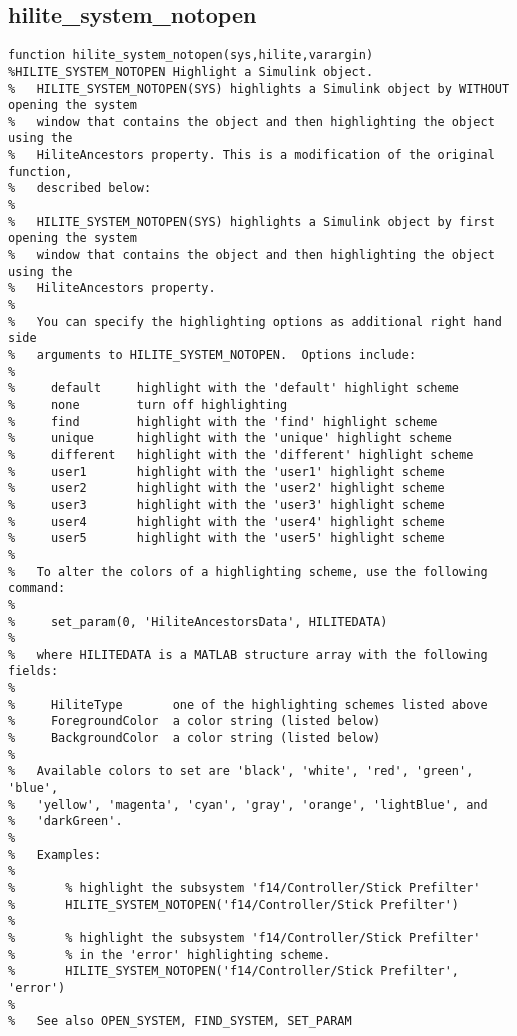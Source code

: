 \documentclass[12pt,letterpaper]{report}
\begin{document}
	\subsection{hilite\_system\_notopen}
\begin{lstlisting}
function hilite_system_notopen(sys,hilite,varargin)
%HILITE_SYSTEM_NOTOPEN Highlight a Simulink object.
%   HILITE_SYSTEM_NOTOPEN(SYS) highlights a Simulink object by WITHOUT opening the system
%   window that contains the object and then highlighting the object using the
%   HiliteAncestors property. This is a modification of the original function,
%   described below:
%
%   HILITE_SYSTEM_NOTOPEN(SYS) highlights a Simulink object by first opening the system
%   window that contains the object and then highlighting the object using the
%   HiliteAncestors property.
%
%   You can specify the highlighting options as additional right hand side
%   arguments to HILITE_SYSTEM_NOTOPEN.  Options include:
%
%     default     highlight with the 'default' highlight scheme
%     none        turn off highlighting
%     find        highlight with the 'find' highlight scheme
%     unique      highlight with the 'unique' highlight scheme
%     different   highlight with the 'different' highlight scheme
%     user1       highlight with the 'user1' highlight scheme
%     user2       highlight with the 'user2' highlight scheme
%     user3       highlight with the 'user3' highlight scheme
%     user4       highlight with the 'user4' highlight scheme
%     user5       highlight with the 'user5' highlight scheme
%
%   To alter the colors of a highlighting scheme, use the following command:
%
%     set_param(0, 'HiliteAncestorsData', HILITEDATA)
%
%   where HILITEDATA is a MATLAB structure array with the following fields:
%
%     HiliteType       one of the highlighting schemes listed above
%     ForegroundColor  a color string (listed below)
%     BackgroundColor  a color string (listed below)
%
%   Available colors to set are 'black', 'white', 'red', 'green', 'blue',
%   'yellow', 'magenta', 'cyan', 'gray', 'orange', 'lightBlue', and
%   'darkGreen'.
%
%   Examples:
%
%       % highlight the subsystem 'f14/Controller/Stick Prefilter'
%       HILITE_SYSTEM_NOTOPEN('f14/Controller/Stick Prefilter')
%
%       % highlight the subsystem 'f14/Controller/Stick Prefilter'
%       % in the 'error' highlighting scheme.
%       HILITE_SYSTEM_NOTOPEN('f14/Controller/Stick Prefilter', 'error')
%
%   See also OPEN_SYSTEM, FIND_SYSTEM, SET_PARAM
\end{lstlisting}
	
\end{document}
